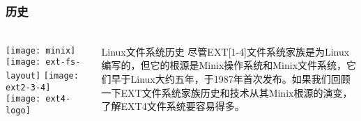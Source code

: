 %
\begin{frame}[fragile]
    \frametitle{历史}

	\frametitle{ }
	\begin{columns}
		\begin{column}{.5\textwidth}
	    \texttt{[image: minix]}
	    \texttt{[image: ext-fs-layout]}
	    \texttt{[image: ext2-3-4]}
		\texttt{[image: ext4-logo]}	
			
		\end{column}
		
		\begin{column}{.5\textwidth}
		
		  	\begin{block}{Linux文件系统历史}
		  	尽管EXT[1-4]文件系统家族是为Linux编写的，但它的根源是Minix操作系统和Minix文件系统，它们早于Linux大约五年，于1987年首次发布。如果我们回顾一下EXT文件系统家族历史和技术从其Minix根源的演变，了解EXT4文件系统要容易得多。
		  \end{block}

		\end{column}
	\end{columns}

\end{frame}



